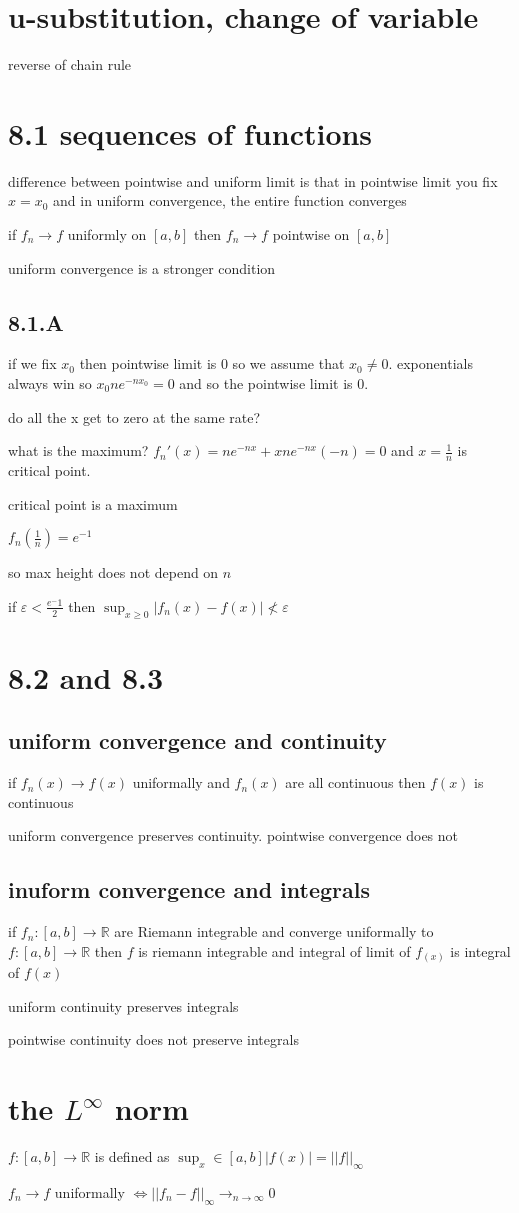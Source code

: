 \documentclass[letterpaper]{article}
\begin{document}
\section*{u-substitution, change of variable}
reverse of chain rule

\section*{8.1 sequences of functions}
difference between pointwise and uniform limit is that in pointwise limit you fix $x=x_0$ and in uniform convergence, the entire function converges 

if $f_n\to f$ uniformly on $[a,b]$ then $f_n\to f$ pointwise on $[a,b]$

uniform convergence is a stronger condition

\subsection*{8.1.A}
if we fix $x_0$ then pointwise limit is 0 so we assume that $x_0\ne 0$. exponentials always win so $x_0ne^{-nx_0}=0$ and so the pointwise limit is 0.

do all the x get to zero at the same rate?

what is the maximum? $f_n'(x)=ne^{-nx}+xne^{-nx}(-n)=0$ and $x=\frac{1}{n}$ is critical point.

critical point is a maximum

$f_n(\frac{1}{n})=e^{-1}$

so max height does not depend on $n$

if $\varepsilon<\frac{e^-1}{2}$ then $\sup_{x\ge0}|f_n(x)-f(x)|\not<\varepsilon$

\section*{8.2 and 8.3}
\subsection*{uniform convergence and continuity}
if $f_n(x)\to f(x)$ uniformally and $f_n(x)$ are all continuous then $f(x)$ is continuous


uniform convergence preserves continuity. pointwise convergence does not

\subsection*{inuform convergence and integrals}
if $f_n:[a,b]\to\mathbb{R}$ are Riemann integrable and converge uniformally  to $f:[a,b]\to\mathbb{R}$ then $f$ is riemann integrable and integral of limit of $f_(x)$ is integral of $f(x)$

uniform continuity preserves integrals

pointwise continuity does not preserve integrals

\section*{the $L^\infty$ norm}
$f:[a,b]\to\mathbb{R}$ is defined as $\sup_x\in[a,b]|f(x)|=||f||_\infty$

$f_n\to f$ uniformally $\Leftrightarrow||f_n-f||_\infty\to_{n\to\infty}0$
\end{document}
